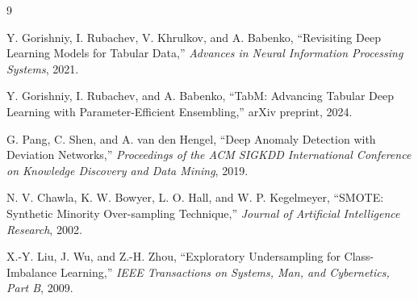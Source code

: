 \documentclass[11pt,a4paper]{article}
\begin{document}
\begin{thebibliography}{9}

Y. Gorishniy, I. Rubachev, V. Khrulkov, and A. Babenko,
``Revisiting Deep Learning Models for Tabular Data,''
\emph{Advances in Neural Information Processing Systems}, 2021.

Y. Gorishniy, I. Rubachev, and A. Babenko,
``TabM: Advancing Tabular Deep Learning with Parameter-Efficient Ensembling,''
arXiv preprint, 2024.

G. Pang, C. Shen, and A. van den Hengel,
``Deep Anomaly Detection with Deviation Networks,''
\emph{Proceedings of the ACM SIGKDD International Conference on Knowledge Discovery and Data Mining}, 2019.

N. V. Chawla, K. W. Bowyer, L. O. Hall, and W. P. Kegelmeyer,
``SMOTE: Synthetic Minority Over-sampling Technique,''
\emph{Journal of Artificial Intelligence Research}, 2002.

X.-Y. Liu, J. Wu, and Z.-H. Zhou,
``Exploratory Undersampling for Class-Imbalance Learning,''
\emph{IEEE Transactions on Systems, Man, and Cybernetics, Part B}, 2009.

\end{thebibliography}
\end{document}
